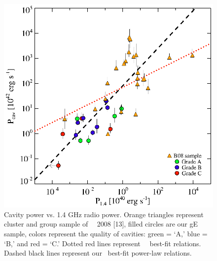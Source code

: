 \documentclass[letterpaper,11pt]{article}
\begin{document}
\begin{center}
\begin{figure}[t]
\begin{minipage}[t]{0.5\linewidth}
      \includegraphics*[width=\textwidth, trim=30mm 5mm 40mm 15mm, clip]{pjet.eps}
      \caption{Cavity power vs. 1.4 GHz radio power. Orange
        triangles represent cluster and group sample of
        \birzan\ \etal\ 2008 [13], filled circles are our gE sample,
        colors represent the quality of cavities: green = `A,' blue
        = `B,' and red = `C.' Dotted red lines represent
        \birzan\ \etal\ best-fit relations. Dashed black lines
        represent our \bces\ best-fit power-law relations.}
      \label{fig:pjet}
    \end{minipage}
  \end{figure}
\end{center}
\end{document}
